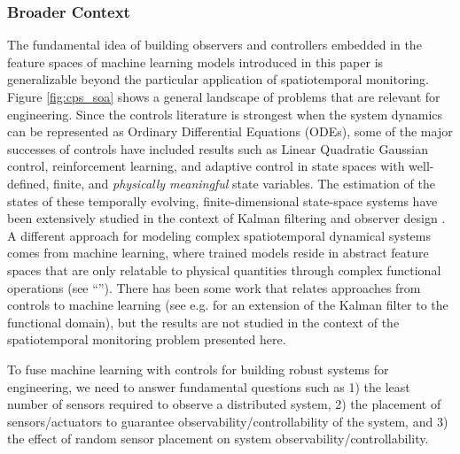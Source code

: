 \documentclass[letterpaper,12pt,peerreviewca,draftcls]{IEEEtran}
\begin{document}
\subsubsection*{Broader Context}
The fundamental idea of building observers and controllers embedded in the feature spaces of machine learning models introduced in this paper is generalizable beyond the particular application of spatiotemporal monitoring. Figure \ref{fig:cps_soa} shows a general landscape of problems that are relevant for engineering. Since the controls literature is strongest when the system dynamics can be represented as Ordinary Differential Equations (ODEs), some of the major successes of controls have included results such as Linear Quadratic Gaussian control, reinforcement learning, and adaptive control in state spaces with well-defined, finite, and \emph{physically meaningful} state variables. The estimation of the states of these temporally evolving, finite-dimensional state-space systems have been extensively studied in the context of Kalman filtering and observer design \cite{Gelb74}. A different approach for modeling complex spatiotemporal dynamical systems comes from machine learning, where trained models reside in abstract feature spaces that are only relatable to physical quantities through complex functional operations (see ``''). There has been some work that relates approaches from controls to machine learning (see e.g. \cite{mardia1998kriged} for an extension of the Kalman filter to the functional domain), but the results are not studied in the context of the spatiotemporal monitoring problem presented here. 

To fuse machine learning with controls for building robust systems for engineering, we need to answer fundamental questions such as 1) the least number of sensors required to observe a distributed system, 2) the placement of sensors/actuators to guarantee observability/controllability of the system, and 3) the effect of random sensor placement on system observability/controllability.
\end{document}

